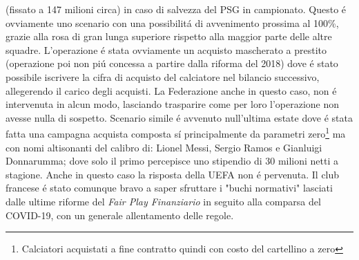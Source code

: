 \documentclass[
    corpo=12pt,
    oneside,
    evenboxes,
    tipotesi=triennale,
    stile=classica,
    oldstyle,
    autoretitolo,
    greek,
]{toptesi}
\begin{document}
\begin{interlinea}{1.5}
(fissato a 147 milioni circa) in caso di salvezza del PSG in campionato.
Questo \'e ovviamente uno scenario con una possibilit\'a di avvenimento prossima al 100\%, grazie alla rosa di gran lunga superiore rispetto alla maggior parte delle altre squadre.
L'operazione \'e stata ovviamente un acquisto mascherato a prestito (operazione poi non pi\'u concessa a partire dalla riforma del 2018) dove
\'e stato possibile iscrivere la cifra di acquisto del calciatore nel bilancio successivo, allegerendo il carico degli acquisti. La Federazione 
anche in questo caso, non \'e intervenuta in alcun modo, lasciando trasparire come per loro l'operazione non avesse nulla di sospetto. 
Scenario simile \'e avvenuto null'ultima estate dove \'e stata fatta una campagna acquista composta s\'i principalmente da parametri zero\footnote{Calciatori acquistati a fine contratto quindi con costo del cartellino a zero}
ma con nomi altisonanti del calibro di: Lionel Messi, Sergio Ramos e Gianluigi Donnarumma; dove solo il primo percepisce uno stipendio di 30 milioni
netti a stagione. Anche in questo caso la risposta della UEFA non \'e pervenuta. Il club francese \'e stato comunque bravo a saper sfruttare
i "buchi normativi" lasciati dalle ultime riforme del \emph{Fair Play Finanziario} in seguito alla comparsa del COVID-19, con un generale
allentamento delle regole.

\end{interlinea}
\end{document}
